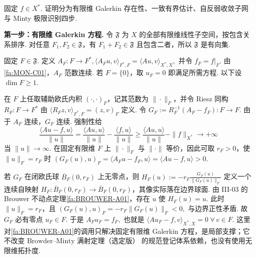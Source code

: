 \begin{FAProof}
固定 \(\displaystyle f\in X^*\). 证明分为有限维 Galerkin 存在性、一致有界估计、自反弱收敛子网与 Minty 极限识别四步.

\textbf{第一步：有限维 Galerkin 方程.} 令 \(\displaystyle\mathfrak F\) 为 \(\displaystyle X\) 的全部有限维线性子空间，按包含关系排序. 对任意 \(\displaystyle F_1,F_2\in\mathfrak F\)，有 \(\displaystyle F_1+F_2\in\mathfrak F\) 且包含二者，所以 \(\displaystyle\mathfrak F\) 是有向集.

固定 \(\displaystyle F\in\mathfrak F\). 定义
\(\displaystyle A_F:F\to F^*, \langle A_Fu,v\rangle_{F^*,F} = \langle Au,v\rangle_{X^*,X},\)
并令 \(\displaystyle f_F=f|_F\). 由\autoref{fa:MON-C01}，\(\displaystyle A_F\) 范数连续. 若 \(\displaystyle F=\{0\}\)，取 \(\displaystyle u_F=0\) 即满足所需方程. 以下设 \(\displaystyle\dim F\geqslant1\).

在 \(\displaystyle F\) 上任取辅助欧氏内积 \(\displaystyle(\cdot,\cdot)_F\)，记其范数为 \(\displaystyle\|\cdot\|_F\)，并令 Riesz 同构 \(\displaystyle R_F:F\to F^*\) 由
\(\displaystyle \langle R_Fz,v\rangle_{F^*,F} = (z,v)_F\)
定义. 令
\(\displaystyle G_F := R_F^{-1}(A_F-f_F):F\to F.\)
由于 \(\displaystyle A_F\) 连续，\(\displaystyle G_F\) 连续. 强制性给
\[
\frac{\langle Au-f,u\rangle}{\|u\|}
=
\frac{\langle Au,u\rangle}{\|u\|}
-
\frac{\langle f,u\rangle}{\|u\|}
\geqslant
\frac{\langle Au,u\rangle}{\|u\|}
-
\|f\|_{X^*}
\longrightarrow+\infty
\]
当 \(\displaystyle\|u\|\to\infty\). 在固定有限维 \(\displaystyle F\) 上 \(\displaystyle\|\cdot\|_F\) 与 \(\displaystyle\|\cdot\|\) 等价，因此可取 \(\displaystyle r_F>0\)，使 \(\displaystyle\|u\|_F=r_F\) 时
\(\displaystyle (G_F(u),u)_F = \langle A_Fu-f_F,u\rangle = \langle Au-f,u\rangle >0.\)

若 \(\displaystyle G_F\) 在闭欧氏球 \(\displaystyle\overline B_F(0,r_F)\) 上无零点，则
\(\displaystyle H_F(u) := -r_F\frac{G_F(u)}{\|G_F(u)\|_F}\)
定义一个连续自映射 \(\displaystyle H_F:\overline B_F(0,r_F)\to\overline B_F(0,r_F)\)，其像实际落在边界球面. 由 III-03 的 Brouwer 不动点定理\autoref{fa:BROUWER-A01}，存在 \(\displaystyle u\) 使 \(\displaystyle H_F(u)=u\). 此时 \(\displaystyle\|u\|_F=r_F\)，且
\(\displaystyle (G_F(u),u)_F = -r_F\|G_F(u)\|_F <0,\)
与边界正性矛盾. 故 \(\displaystyle G_F\) 必有零点 \(\displaystyle u_F\in F\). 于是
\(\displaystyle A_Fu_F=f_F,\)
也就是
\(\displaystyle \langle Au_F-f,v\rangle_{X^*,X}=0 \;\forall\,v\in F.\)
这里对\autoref{fa:BROUWER-A01}的调用只解决固定有限维 Galerkin 方程，是局部支撑；它不改变 \(\displaystyle\text{Browder--Minty 满射定理（选定版）}\) 的规范登记体系依赖，也没有使用无限维拓扑度.


\end{FAProof}
